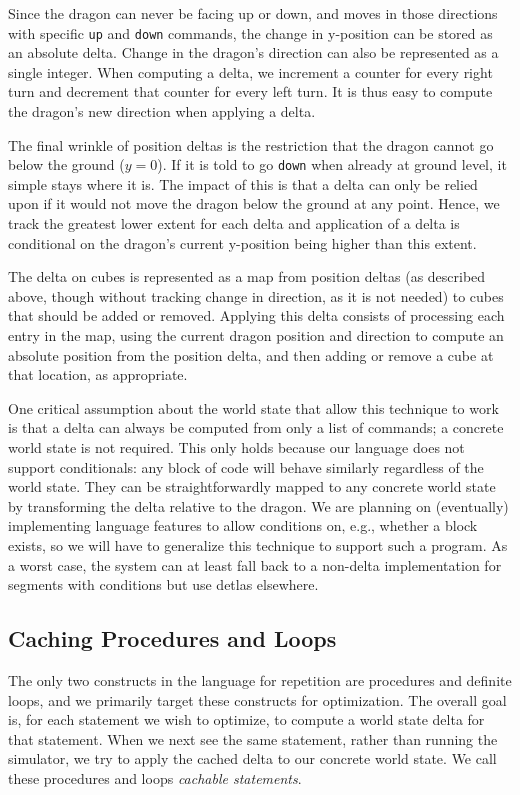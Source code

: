 \documentclass{sig-alternate}
\begin{document}
Since the dragon can never be facing up or down, and moves in those directions with specific \texttt{up} and \texttt{down} commands, the change in y-position can be stored as an absolute delta. Change in the dragon's direction can also be represented as a single integer. When computing a delta, we increment a counter for every right turn and decrement that counter for every left turn. It is thus easy to compute the dragon's new direction when applying a delta.

The final wrinkle of position deltas is the restriction that the dragon cannot go below the ground ($y=0$). If it is told to go \texttt{down} when already at ground level, it simple stays where it is. The impact of this is that a delta can only be relied upon if it would not move the dragon below the ground at any point. Hence, we track the greatest lower extent for each delta and application of a delta is conditional on the dragon's current y-position being higher than this extent. 

The delta on cubes is represented as a map from position deltas (as described above, though without tracking change in direction, as it is not needed) to cubes that should be added or removed. Applying this delta consists of processing each entry in the map, using the current dragon position and direction to compute an absolute position from the position delta, and then adding or remove a cube at that location, as appropriate.

One critical assumption about the world state that allow this technique to work is that a delta can always be computed from only a list of commands; a concrete world state is not required. This only holds because our language does not support conditionals: any block of code will behave similarly regardless of the world state. They can be straightforwardly mapped to any concrete world state by transforming the delta relative to the dragon. We are planning on (eventually) implementing language features to allow conditions on, e.g., whether a block exists, so we will have to generalize this technique to support such a program. As a worst case, the system can at least fall back to a non-delta implementation for segments with conditions but use detlas elsewhere.

\subsection{Caching Procedures and Loops}

The only two constructs in the language for repetition are procedures and definite loops, and we primarily target these constructs for optimization. The overall goal is, for each statement we wish to optimize, to compute a world state delta for that statement. When we next see the same statement, rather than running the simulator, we try to apply the cached delta to our concrete world state. We call these procedures and loops \emph{cachable statements}.
\end{document}
